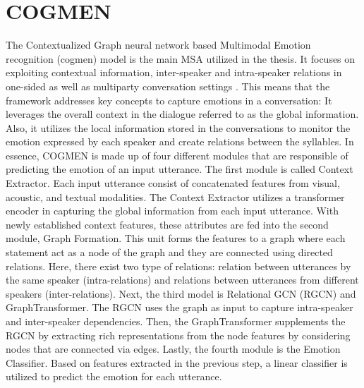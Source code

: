 \section{COGMEN}
\label{sec:COGMEN}
The Contextualized Graph neural network based Multimodal Emotion recognition (\acrshort{cogmen}) model is the main MSA utilized in the thesis. It focuses on exploiting contextual information, inter-speaker and intra-speaker relations in one-sided as well as multiparty conversation settings \cite{COGMEN_joshi-etal-2022-cogmen} \cite{HP_Advanced}. This means that the framework addresses key concepts to capture emotions in a conversation: It leverages the overall context in the dialogue referred to as the global information. Also, it utilizes the local information stored in the conversations to monitor the emotion expressed by each speaker and create relations between the syllables. In essence, COGMEN is made up of four different modules that are responsible of predicting the emotion of an input utterance. The first module is called Context Extractor. Each input utterance consist of concatenated features from visual, acoustic, and textual modalities. The Context Extractor utilizes a transformer encoder in capturing the global information from each input utterance. With newly established context features, these attributes are fed into the second module, Graph Formation. This unit forms the features to a graph where each statement act as a node of the graph and they are connected using directed relations. Here, there exist two type of relations: relation between utterances by the same speaker (intra-relations) and relations between utterances from different speakers (inter-relations). Next, the third model is Relational GCN (RGCN) and GraphTransformer. The RGCN uses the graph as input to capture intra-speaker and inter-speaker dependencies. Then, the GraphTransformer supplements the RGCN by extracting rich representations from the node features by considering nodes that are connected via edges. Lastly, the fourth module is the Emotion Classifier. Based on features extracted in the previous step, a linear classifier is utilized to predict the emotion for each utterance.

